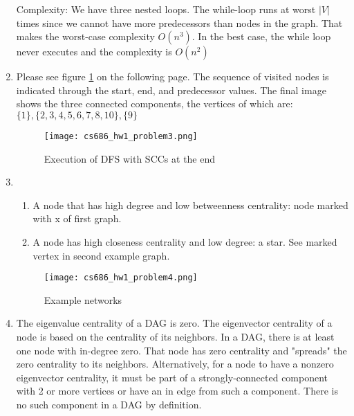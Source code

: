 \documentclass[]{article}
\begin{document}
\begin{enumerate}
\begin{verbatim}
	\end{verbatim}

	Complexity:
	We have three nested loops. The while-loop runs at worst $|V|$ times since we cannot have more predecessors than nodes in the graph. That makes the worst-case complexity $O(n^3)$. In the best case, the while loop never executes and the complexity is $O(n^2)$


	\item 	Please see figure \ref{fig:prob3} on the following page. The sequence of visited nodes is indicated through the start, end, and predecessor values. The final image shows the three connected components, the vertices of which are: $\{1\}, \{2,3,4,5,6,7,8,10\}, \{9\}$
	
	
	\begin{figure}[H]
		\texttt{[image: cs686\_hw1\_problem3.png]}
		\caption{Execution of DFS with SCCs at the end}
		\label{fig:prob3}
	\end{figure}


	\item \begin{minipage}[t]{\linewidth}
			\begin{enumerate}
				\item A node that has high degree and low betweenness centrality: node marked with x of first graph.
				
				\item A node has high closeness centrality and low degree: a star. See marked vertex in second example graph.
			\end{enumerate}
			\begin{figure}[H]
				\texttt{[image: cs686\_hw1\_problem4.png]}
				\caption{Example networks}
				\label{fig:prob4}
			\end{figure}
	\end{minipage} 

	\item The eigenvalue centrality of a DAG is zero. The eigenvector centrality of a node is based on the centrality of its neighbors. In a DAG, there is at least one node with in-degree zero. That node has zero centrality and "spreads" the zero centrality to its neighbors. Alternatively, for a node to have a nonzero eigenvector centrality, it must be part of a strongly-connected component with 2 or more vertices or have an in edge from such a component\cite{newman}. There is no such component in a DAG by definition.
	

\end{enumerate}
\end{document}
